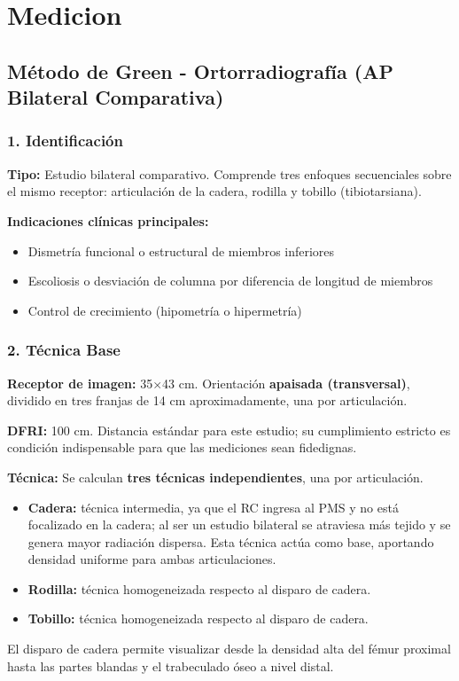 	
	\section{Medicion}
	
	\subsection{Método de Green - Ortorradiografía (AP Bilateral Comparativa)}
	
	\subsubsection*{1. Identificación}
	
	\textbf{Tipo:} Estudio bilateral comparativo. Comprende tres enfoques secuenciales sobre el mismo receptor: articulación de la cadera, rodilla y tobillo (tibiotarsiana).
	
	\textbf{Indicaciones clínicas principales:}
	\begin{itemize}
		\item Dismetría funcional o estructural de miembros inferiores
		\item Escoliosis o desviación de columna por diferencia de longitud de miembros
		\item Control de crecimiento (hipometría o hipermetría)
	\end{itemize}
	
	\subsubsection*{2. Técnica Base}
	
	\textbf{Receptor de imagen:} 35$\times$43 cm. Orientación \textbf{apaisada (transversal)}, dividido en tres franjas de 14 cm aproximadamente, una por articulación.
	
	\textbf{DFRI:} 100 cm. Distancia estándar para este estudio; su cumplimiento estricto es condición indispensable para que las mediciones sean fidedignas.
	
	\textbf{Técnica:} Se calculan \textbf{tres técnicas independientes}, una por articulación.
	\begin{itemize}
		\item \textbf{Cadera:} técnica intermedia, ya que el RC ingresa al PMS y no está focalizado en la cadera; al ser un estudio bilateral se atraviesa más tejido y se genera mayor radiación dispersa. Esta técnica actúa como base, aportando densidad uniforme para ambas articulaciones.
		\item \textbf{Rodilla:} técnica homogeneizada respecto al disparo de cadera.
		\item \textbf{Tobillo:} técnica homogeneizada respecto al disparo de cadera.
	\end{itemize}
	El disparo de cadera permite visualizar desde la densidad alta del fémur proximal hasta las partes blandas y el trabeculado óseo a nivel distal.
	
